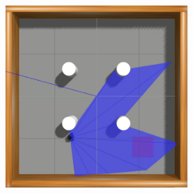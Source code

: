\begin{figure}[H]
\begin{center}
\begin{subfigure}[b]{0.60\textwidth}
\begin{subfigure}[b]{0.24\textwidth}
        \end{subfigure}
        \hfill
        \begin{subfigure}[b]{0.24\textwidth}
            \includegraphics[width=\textwidth]{imagens/simulated_envs/sim_env2_ddpg/4.png}
        \end{subfigure}
        

\end{subfigure}
\end{center}
\end{figure}
